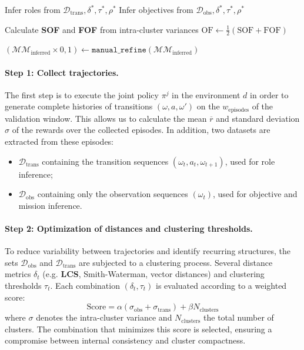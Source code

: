 \documentclass[pdflatex,sn-mathphys-num]{sn-jnl}%
\theoremstyle{thmstyleone}%
\theoremstyle{thmstyletwo}%
\theoremstyle{thmstylethree}%
\begin{document}
\begin{algorithm}[h!]
    Infer roles from $\mathcal{D}_{\text{trans}}, \delta^*, \tau^*, \rho^*$ \;
    Infer objectives from $\mathcal{D}_{\text{obs}}, \delta^*, \tau^*, \rho^*$ \;
    
    Calculate \textbf{SOF} and \textbf{FOF} from intra-cluster variances \;
    $\text{OF} \gets \frac{1}{2}(\text{SOF} + \text{FOF})$ \;
    
    $(\mathcal{MM}_{\text{inferred}} \times {0,1}) \gets \texttt{manual\_refine}(\mathcal{MM}_{\text{inferred}})$
    
\end{algorithm}



\paragraph*{Step 1: Collect trajectories.}
The first step is to execute the joint policy $\pi^j$ in the environment $d$ in order to generate complete histories of transitions $(\omega, a, \omega')$ on the $w_{\text{episodes}}$ of the validation window. This allows us to calculate the mean $\overline{r}$ and standard deviation $\sigma$ of the rewards over the collected episodes.
In addition, two datasets are extracted from these episodes:
\begin{itemize}
    \item $\mathcal{D}_{\text{trans}}$ containing the transition sequences $(\omega_t, a_t, \omega_{t+1})$, used for role inference;
    \item $\mathcal{D}_{\text{obs}}$ containing only the observation sequences $(\omega_t)$, used for objective and mission inference.
\end{itemize}

\paragraph*{Step 2: Optimization of distances and clustering thresholds.}
To reduce variability between trajectories and identify recurring structures, the sets $\mathcal{D}_{\text{obs}}$ and $\mathcal{D}_{\text{trans}}$ are subjected to a clustering process.
Several distance metrics $\delta_t$ (e.g. \textbf{LCS}, Smith-Waterman, vector distances) and clustering thresholds $\tau_t$.
Each combination $(\delta_t, \tau_t)$ is evaluated according to a weighted score:
\[
    \text{Score} = \alpha (\sigma_{\text{obs}} + \sigma_{\text{trans}}) + \beta N_{\text{clusters}}
\]
where $\sigma$ denotes the intra-cluster variance and $N_{\text{clusters}}$ the total number of clusters.
The combination that minimizes this score is selected, ensuring a compromise between internal consistency and cluster compactness.
\end{document}
